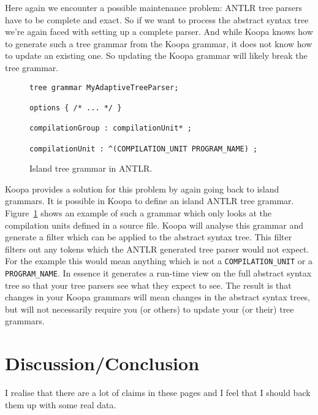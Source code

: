 \documentclass[a4paper]{article}
\begin{document}
Here again we encounter a possible maintenance problem: ANTLR tree parsers have to be complete and exact. So if we want to process the abstract syntax tree we're again faced with setting up a complete parser. And while Koopa knows how to generate such a tree grammar from the Koopa grammar, it does not know how to update an existing one. So updating the Koopa grammar will likely break the tree grammar.

\begin{figure}
\centering
\begin{lstlisting}
tree grammar MyAdaptiveTreeParser;

options { /* ... */ }

compilationGroup : compilationUnit* ;

compilationUnit : ^(COMPILATION_UNIT PROGRAM_NAME) ;
\end{lstlisting}
\caption{Island tree grammar in ANTLR.}
\label{fig:island-tree-grammar}
\end{figure}

Koopa provides a solution for this problem by again going back to island grammars. It is possible in Koopa to define an island ANTLR tree grammar. Figure~\ref{fig:island-tree-grammar} shows an example of such a grammar which only looks at the compilation units defined in a source file. Koopa will analyse this grammar and generate a filter which can be applied to the abstract syntax tree. This filter filters out any tokens which the ANTLR generated tree parser would not expect. For the example this would mean anything which is not a \lstinline|COMPILATION_UNIT| or a \lstinline|PROGRAM_NAME|. In essence it generates a run-time view on the full abstract syntax tree so that your tree parsers see what they expect to see. The result is that changes in your Koopa grammars will mean changes in the abstract syntax trees, but will not necessarily require you (or others) to update your (or their) tree grammars.


\section{Discussion/Conclusion}
\label{conclusion}

I realise that there are a lot of claims in these pages and I feel that I should back them up with some real data.
\end{document}
